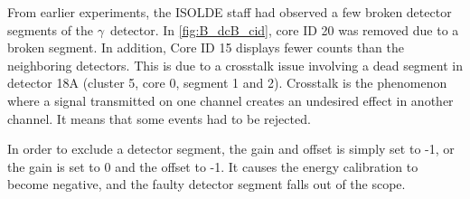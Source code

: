 \documentclass[twoside,english]{uiofysmaster/uiofysmaster}
\newcommand{\Sm}{$^{140}$Sm} %
\newcommand{\Pb}{$^{208}$Pb}
\newcommand{\ga}{$\gamma$}
\let\orgautoref\autoref
\renewcommand{\autoref}
        {%
		 \def\sectionautorefname{Section}%
		 \def\subsectionautorefname{Section}%
		 \def\subsubsectionautorefname{Section}%
		 \def\chapterautorefname{Chapter}%
          \orgautoref}
\begin{document}
From earlier experiments, the ISOLDE staff had observed a few broken detector segments of the \ga\ detector.
In \autoref{fig:B_dcB_cid}, core ID 20 was removed due to a broken segment. 
In addition, Core ID 15 displays fewer counts than the neighboring detectors.
This is due to a crosstalk issue involving a dead segment in detector 18A (cluster 5, core 0, segment 1 and 2). 
Crosstalk is the phenomenon where a signal transmitted on one channel creates an undesired effect in another channel. 
It means that some events had to be rejected.

In order to exclude a detector segment, the gain and offset is simply set to -1, or the gain is set to 0 and the offset to -1.
It causes the energy calibration to become negative, and the faulty detector segment falls out of the scope. 





%		
%		
\end{document}
